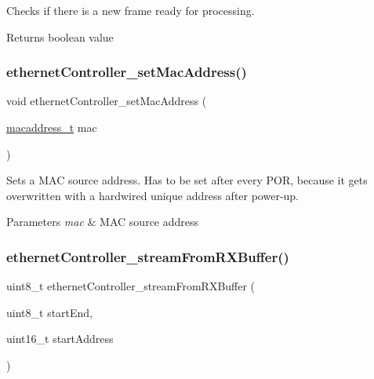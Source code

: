 Checks if there is a new frame ready for processing. 

\begin{DoxyReturn}{Returns}
boolean value 
\end{DoxyReturn}
\mbox{\label{group__data__reception_ga4856965b47df99d3532a7d1cbb494e02}} 
\subsubsection{\texorpdfstring{ethernetController\_setMacAddress()}{ethernetController\_setMacAddress()}}
{\footnotesize\ttfamily void ethernet\+Controller\+\_\+set\+Mac\+Address (\begin{DoxyParamCaption}\item[{\mbox{\hyperlink{group__ethernet_gacb865bcbf50a6c8cef05581bfabff373}{macaddress\+\_\+t}}}]{mac }\end{DoxyParamCaption})}



Sets a M\+AC source address. Has to be set after every P\+OR, because it gets overwritten with a hardwired unique address after power-\/up. 


\begin{DoxyParams}{Parameters}
{\em mac} & M\+AC source address \\
\hline
\end{DoxyParams}
\mbox{\label{group__data__reception_ga152b0e0b0d3ed72affb7feac14035b6e}} 
\subsubsection{\texorpdfstring{ethernetController\_streamFromRXBuffer()}{ethernetController\_streamFromRXBuffer()}}
{\footnotesize\ttfamily uint8\+\_\+t ethernet\+Controller\+\_\+stream\+From\+R\+X\+Buffer (\begin{DoxyParamCaption}\item[{uint8\+\_\+t}]{start\+End,  }\item[{uint16\+\_\+t}]{start\+Address }\end{DoxyParamCaption})}



